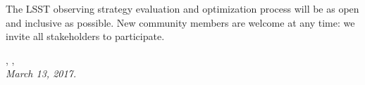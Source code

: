 \noindent The LSST observing strategy evaluation and optimization
process will be as open and inclusive as possible. New community members
are welcome at any time: we invite all stakeholders to participate.

\vspace{2\baselineskip}

{\raggedleft {}, ,  \\
 \medskip \hspace{0.8\linewidth} \it March 13, 2017.}

\clearpage

